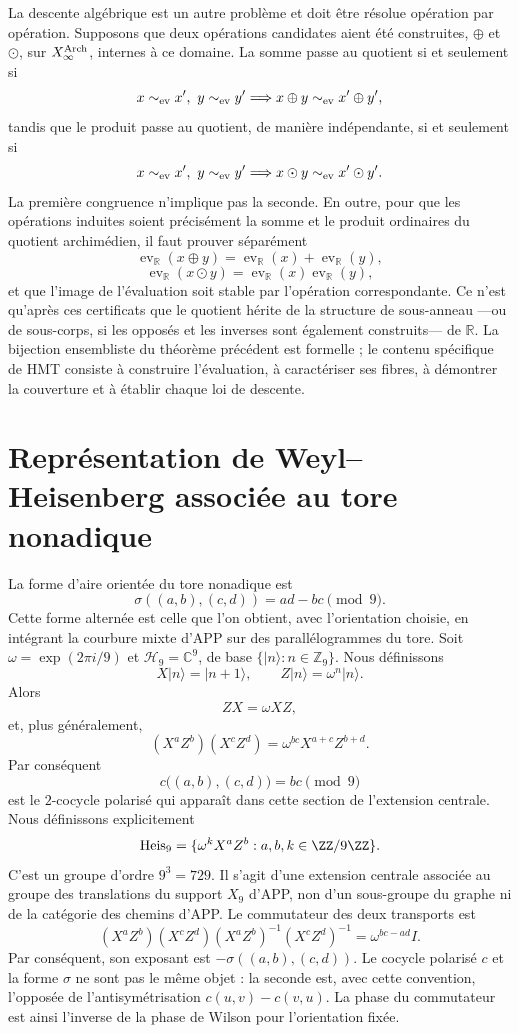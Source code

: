 La descente algébrique est un autre problème et doit être résolue opération par
opération. Supposons que deux opérations candidates aient été construites,
\(\oplus\) et \(\odot\), sur \(X_\infty^{\rm Arch}\), internes à ce
domaine. La somme passe au quotient si et seulement si
\[
x\sim_{\rm ev}x',\ y\sim_{\rm ev}y'
\Longrightarrow
x\oplus y\sim_{\rm ev}x'\oplus y',
\]
tandis que le produit passe au quotient, de manière indépendante, si et seulement si
\[
x\sim_{\rm ev}x',\ y\sim_{\rm ev}y'
\Longrightarrow
x\odot y\sim_{\rm ev}x'\odot y'.
\]
La première congruence n'implique pas la seconde. En outre, pour que les opérations
induites soient précisément la somme et le produit ordinaires du quotient
archimédien, il faut prouver séparément
\[
\operatorname{ev}_{\mathbb R}(x\oplus y)
=\operatorname{ev}_{\mathbb R}(x)+\operatorname{ev}_{\mathbb R}(y),
\]
\[
\operatorname{ev}_{\mathbb R}(x\odot y)
=\operatorname{ev}_{\mathbb R}(x)\operatorname{ev}_{\mathbb R}(y),
\]
et que l'image de l'évaluation soit stable par l'opération correspondante.
Ce n'est qu'après ces certificats que le quotient hérite de la structure de
sous-anneau ---ou de sous-corps, si les opposés et les inverses sont également construits---
de \(\mathbb R\). La bijection ensembliste du théorème précédent est formelle ;
le contenu spécifique de HMT consiste à construire l'évaluation, à caractériser ses
fibres, à démontrer la couverture et à établir chaque loi de descente.

\section{Représentation de Weyl--Heisenberg associée au tore nonadique}

La forme d'aire orientée du tore nonadique est
\[
\sigma((a,b),(c,d))=ad-bc\pmod9.
\]
Cette forme alternée est celle que l'on obtient, avec l'orientation choisie, en
intégrant la courbure mixte d'APP sur des parallélogrammes du tore. Soit
\(\omega=\exp(2\pi i/9)\) et
\(\mathcal H_9=\mathbb C^9\), de base \(\{|n\rangle:n\in\mathbb Z_9\}\).
Nous définissons
\[
X|n\rangle=|n+1\rangle,
\qquad
Z|n\rangle=\omega^n|n\rangle.
\]
Alors
\[
ZX=\omega XZ,
\]
et, plus généralement,
\[
(X^aZ^b)(X^cZ^d)
=\omega^{bc}X^{a+c}Z^{b+d}.
\]
Par conséquent
\[
 c\bigl((a,b),(c,d)\bigr)=bc\pmod9
\]
est le \(2\)-cocycle polarisé qui apparaît dans cette section de l'extension
centrale. Nous définissons explicitement
\[
 \operatorname{Heis}_9
 =\{\omega^kX^aZ^b:a,b,k\in\ZZ/9\ZZ\}.
\]
C'est un groupe d'ordre \(9^3=729\). Il s'agit d'une extension centrale associée
au groupe des translations du support \(X_9\) d'APP, non d'un sous-groupe du
graphe ni de la catégorie des chemins d'APP\@.
Le commutateur des deux transports est
\[
(X^aZ^b)(X^cZ^d)(X^aZ^b)^{-1}(X^cZ^d)^{-1}
=\omega^{bc-ad}I.
\]
Par conséquent, son exposant est \(-\sigma((a,b),(c,d))\). Le cocycle
polarisé \(c\) et la forme \(\sigma\) ne sont pas le même objet : la seconde est,
avec cette convention, l'opposée de l'antisymétrisation
\(c(u,v)-c(v,u)\). La phase du commutateur est ainsi l'inverse de la phase de
Wilson pour l'orientation fixée.

